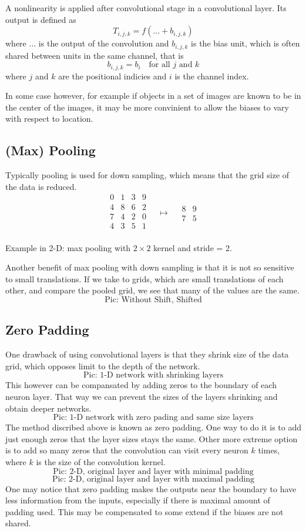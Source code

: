 \documentclass[]{article}
\begin{document}
A nonlinearity is applied after convolutional stage in a convolutional layer. Its
output is defined as
\[
T_{i,j,k} = f(... + b_{i,j,k})
\]
where $...$ is the output of the convolution and $b_{i, j, k}$ is the bias unit,
which is often shared between units in the same channel, that is
\[
b_{i, j, k} = b_i \quad \text{for all $j$ and $k$}
\]
where $j$ and $k$ are the positional indicies and $i$ is the channel index.

In some case however, for example if objects in a set of images are known to be
in the center of the images, it may be more convinient to allow the biases to vary
with respect to location.

\subsection{(Max) Pooling}
Typically pooling is used for down sampling, which means that the grid size of
the data is reduced.
\[
\begin{array}{c|c|c|c}
  0 & 1 & 3 & 9\\
  \hline
  4 & 8 & 6 & 2\\
  \hline
  7 & 4 & 2 & 0\\
  \hline
  4 & 3 & 5 & 1\\
 \end{array}
 \quad \mapsto \quad
 \begin{array}{c|c}
   8 & 9\\
   \hline
   7 & 5
  \end{array}
 \]
\begin{center}Example in 2-D: max pooling with $2\times2$ kernel and stride = 2.\end{center}
Another benefit of max pooling with down sampling is that it is not so sensitive
to small translations. If we take to grids, which are small translations of each
other, and compare the pooled grid, we see that many of the values are the same.
\[
\text{Pic: Without Shift, Shifted}
\]

\subsection{Zero Padding}
One drawback of using convolutional layers is that they shrink size of the data
grid, which opposes limit to the depth of the network.
\[
\text{Pic: 1-D network with shrinking layers}
\]
This however can be compansated by
adding zeros to the boundary of each neuron layer. That way we can prevent the
sizes of the layers shrinking and obtain deeper networks.
\[
\text{Pic: 1-D network with zero pading and same size layers}
\]
The method discribed above is known as zero padding. One way to do it is to add
just enough zeros that the layer sizes stays the same. Other more extreme option
is to add so many zeros that the convolution can visit every neuron $k$ times,
where $k$ is the size of the convolution kernel.
\[
\text{Pic: 2-D, original layer and layer with minimal padding}
\]
\[
\text{Pic: 2-D, original layer and layer with maximal padding}
\]
One may notice that zero padding makes the outputs near the boundary to have less
information from the inputs, especially if there is maximal amount of padding
used. This may be compensated to some extend if the biases are not shared.
\end{document}
